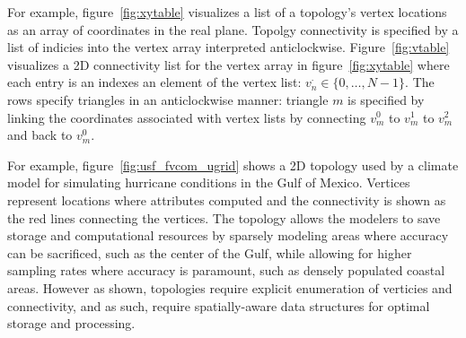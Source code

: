 For example, figure~\ref{fig:xytable} visualizes a list of a topology's
vertex locations as an array of coordinates in the real plane. Topolgy
connectivity is specified by a list of indicies into the vertex array
interpreted anticlockwise. Figure~\ref{fig:vtable} visualizes a 2D
connectivity list for the vertex array in figure~\ref{fig:xytable}
where each entry is an indexes an element of the vertex list:
$v_n^{\cdot}\in \{0,\ldots,N-1\}$. The rows specify triangles in an
anticlockwise manner: triangle $m$ is specified by linking the
coordinates associated with vertex lists by connecting $v^0_m$ to
$v^1_m$ to $v^2_m$ and back to $v^0_m$.


For example, figure~\ref{fig:usf_fvcom_ugrid} shows a \ugrid{} 2D
topology used by a climate model for simulating hurricane conditions
in the Gulf of Mexico. Vertices represent locations where attributes
computed and the connectivity is shown as the red lines connecting the
vertices. The \ugrid{} topology allows the modelers to save storage
and computational resources by sparsely modeling areas where accuracy
can be sacrificed, such as the center of the Gulf, while allowing for
higher sampling rates where accuracy is paramount, such as densely
populated coastal areas. However as shown, \ugrid{} topologies require
explicit enumeration of verticies and connectivity, and as such,
require spatially-aware data structures for optimal storage and
processing.

